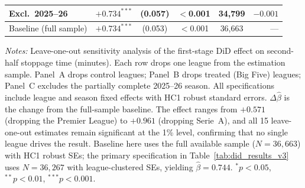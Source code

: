 \begin{table}[htbp]
\begin{threeparttable}
\begin{tabular}{lccccr}
Excl.\ 2025--26          & $+0.734^{***}$ & (0.057) & $<$0.001 & 34,799 & $-0.001$ \\
\midrule
Baseline (full sample)   & $+0.734^{***}$ & (0.053) & $<$0.001 & 36,663 & --- \\
\bottomrule
\end{tabular}
\begin{tablenotes}[flushleft]
\footnotesize
\item \textit{Notes:} Leave-one-out sensitivity analysis of the first-stage DiD effect on
second-half stoppage time (minutes). Each row drops one league from the estimation sample.
Panel~A drops control leagues; Panel~B drops treated (Big Five) leagues; Panel~C excludes the
partially complete 2025--26 season. All specifications include league and season fixed
effects with HC1 robust standard errors. $\Delta\hat{\beta}$ is the change from the
full-sample baseline. The effect ranges from $+0.571$ (dropping the Premier League) to
$+0.961$ (dropping Serie~A), and all 15 leave-one-out estimates remain significant at the
1\% level, confirming that no single league drives the result.
Baseline here uses the full available sample ($N = 36{,}663$) with HC1 robust SEs; the primary specification in Table~\ref{tab:did_results_v3} uses $N = 36{,}267$ with league-clustered SEs, yielding $\hat{\beta} = 0.744$.
$^{*}p<0.05$, $^{**}p<0.01$, $^{***}p<0.001$.
\end{tablenotes}
\end{threeparttable}
\end{table}
